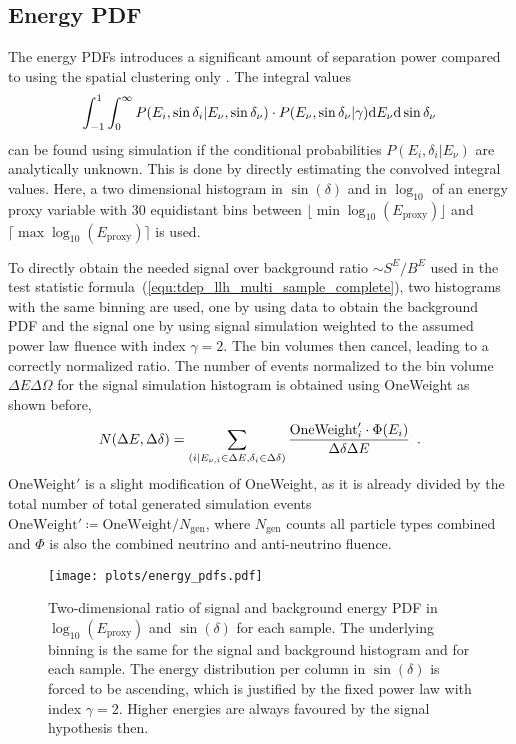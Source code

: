 \subsection*{Energy PDF}
The energy PDFs introduces a significant amount of separation power compared to using the spatial clustering only \cite{Braun:2008bg}.
The integral values
\begin{equation}
  \int_{-1}^{1}\int_0^\infty
    P(E_i,\sin{\delta_i}|E_\nu, \sin{\delta_\nu})\cdot
    P(E_\nu, \sin{\delta_\nu}|\gamma) \mathrm{d}E_\nu\mathrm{d}\sin{\delta_\nu}
\end{equation}
can be found using simulation if the conditional probabilities $P(E_i,\delta_i|E_\nu)$ are analytically unknown.
This is done by directly estimating the convolved integral values.
Here, a two dimensional histogram in $\sin(\delta)$ and in $\log_{10}$ of an energy proxy variable with $\num{30}$ equidistant bins between $\lfloor \min\log_{10}(E_\text{proxy}) \rfloor$ and $\lceil \max\log_{10}(E_\text{proxy}) \rceil$ is used.

To directly obtain the needed signal over background ratio $\sim S^E / B^E$ used in the test statistic formula~(\ref{equ:tdep_llh_multi_sample_complete}), two histograms with the same binning are used, one by using data to obtain the background PDF and the signal one by using signal simulation weighted to the assumed power law fluence with index $\gamma = 2$.
The bin volumes then cancel, leading to a correctly normalized ratio.
The number of events normalized to the bin volume $\Delta E\Delta\Omega$ for the signal simulation histogram is obtained using OneWeight as shown before,
\begin{equation}
  \label{equ:nevts_from_oneweight}
  N(\Delta E, \Delta\delta)
  = \sum_{(i|E_{\nu,i}\in\Delta E, \delta_i\in\Delta\delta)}
    \frac{\text{OneWeight}'_i \cdot \Phi(E_i)}{\Delta\delta \Delta E}
  \enspace\text{.}
\end{equation}
OneWeight$'$ is a slight modification of OneWeight, as it is already divided by the total number of total generated simulation events $\text{OneWeight}'\coloneqq\text{OneWeight}/N_\text{gen}$, where $N_\text{gen}$ counts all particle types combined and $\Phi$ is also the combined neutrino and anti-neutrino fluence.

\begin{figure}[htbp]
  \centering
  \texttt{[image: plots/energy\_pdfs.pdf]}
  \caption[Energy PDFs for the time-dependent analysis]{
    Two-dimensional ratio of signal and background energy PDF in $\log_{10}\left(E_\text{proxy}\right)$ and $\sin(\delta)$ for each sample.
    The underlying binning is the same for the signal and background histogram and for each sample.
    The energy distribution per column in $\sin(\delta)$ is forced to be ascending, which is justified by the fixed power law with index $\gamma=2$.
    Higher energies are always favoured by the signal hypothesis then.
  }
  \label{fig:tdep_energy_pdfs}
\end{figure}

